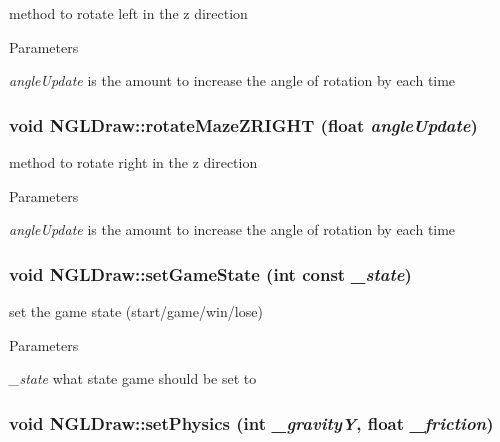method to rotate left in the z direction 
\begin{DoxyParams}{Parameters}
\item[{\em angleUpdate}]is the amount to increase the angle of rotation by each time \end{DoxyParams}
\hypertarget{classNGLDraw_a52716a5b69085b95eec3f0a554d0442e}{
\subsubsection[{rotateMazeZRIGHT}]{\setlength{\rightskip}{0pt plus 5cm}void NGLDraw::rotateMazeZRIGHT (float {\em angleUpdate})}}
\label{classNGLDraw_a52716a5b69085b95eec3f0a554d0442e}


method to rotate right in the z direction 
\begin{DoxyParams}{Parameters}
\item[{\em angleUpdate}]is the amount to increase the angle of rotation by each time \end{DoxyParams}
\hypertarget{classNGLDraw_a79b107d9d00406530f7693159c6afdad}{
\subsubsection[{setGameState}]{\setlength{\rightskip}{0pt plus 5cm}void NGLDraw::setGameState (int const  {\em \_\-state})}}
\label{classNGLDraw_a79b107d9d00406530f7693159c6afdad}


set the game state (start/game/win/lose) 
\begin{DoxyParams}{Parameters}
\item[{\em \_\-state}]what state game should be set to \end{DoxyParams}
\hypertarget{classNGLDraw_af568498c828386ab732bbbde37ccf607}{
\subsubsection[{setPhysics}]{\setlength{\rightskip}{0pt plus 5cm}void NGLDraw::setPhysics (int {\em \_\-gravityY}, \/  float {\em \_\-friction})}}
\label{classNGLDraw_af568498c828386ab732bbbde37ccf607}


